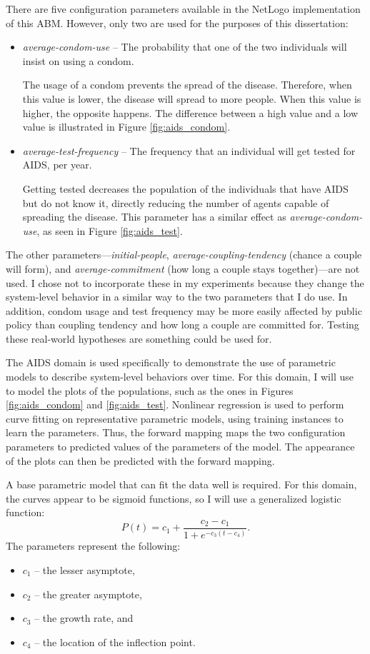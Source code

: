 There are five configuration parameters available in the NetLogo implementation of this ABM.
However, only two are used for the purposes of this dissertation:
\begin{itemize}
  \item \textit{average-condom-use} -- The probability that one of the two individuals will insist on using a condom.

The usage of a condom prevents the spread of the disease.
Therefore, when this value is lower, the disease will spread to more people.
When this value is higher, the opposite happens.
The difference between a high value and a low value is illustrated in Figure \ref{fig:aids_condom}.

  \item \textit{average-test-frequency} -- The frequency that an individual will get tested for AIDS, per year.

Getting tested decreases the population of the individuals that have AIDS but do not know it, directly reducing the number of agents capable of spreading the disease.
This parameter has a similar effect as \textit{average-condom-use}, as seen in Figure \ref{fig:aids_test}.
\end{itemize}
The other parameters---\textit{initial-people}, \textit{average-coupling-tendency} (chance a couple will form), and \textit{average-commitment} (how long a couple stays together)---are not used.
I chose not to incorporate these in my experiments because they change the system-level behavior in a similar way to the two parameters that I do use.
In addition, condom usage and test frequency may be more easily affected by public policy than coupling tendency and how long a couple are committed for.
Testing these real-world hypotheses are something \fw could be used for.

The AIDS domain is used specifically to demonstrate the use of parametric models to describe system-level behaviors over time.
For this domain, I will use \fw to model the plots of the populations, such as the ones in Figures \ref{fig:aids_condom} and \ref{fig:aids_test}.
Nonlinear regression is used to perform curve fitting on representative parametric models, using training instances to learn the parameters.
Thus, the forward mapping maps the two configuration parameters to predicted values of the parameters of the model.
The appearance of the plots can then be predicted with the forward mapping.

A base parametric model that can fit the data well is required.
For this domain, the curves appear to be sigmoid functions, so I will use a generalized logistic function:
\[P(t) = c_1 + \displaystyle\frac{c_2 - c_1}{1 + e^{-c_3 (t - c_4)}}.\]
The parameters represent the following:
\begin{itemize}
 \item $c_1$ -- the lesser asymptote,
 \item $c_2$ -- the greater asymptote,
 \item $c_3$ -- the growth rate, and
 \item $c_4$ -- the location of the inflection point.
\end{itemize}


